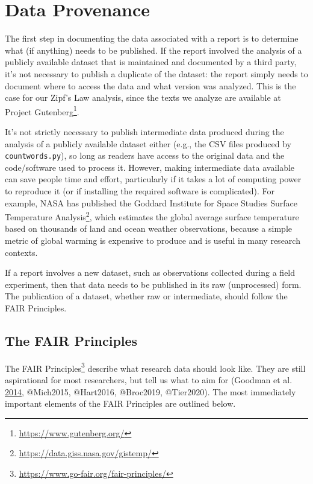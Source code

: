 \documentclass[
]{krantz}
\renewcommand{\href}[2]{#2\footnote{\url{#1}}}
\begin{document}
\hypertarget{provenance-data}{%
\section{Data Provenance}\label{provenance-data}}

The first step in documenting the data associated with a report
is to determine what (if anything) needs to be published.
If the report involved the analysis of a publicly available dataset
that is maintained and documented by a third party,
it's not necessary to publish a duplicate of the dataset:
the report simply needs to document where to access the data
and what version was analyzed.
This is the case for our Zipf's Law analysis,
since the texts we analyze are available at \href{https://www.gutenberg.org/}{Project Gutenberg}.

It's not strictly necessary to publish intermediate data
produced during the analysis of a publicly available dataset either
(e.g., the CSV files produced by \texttt{countwords.py}),
so long as readers have access to the original data and the code/software used to process it.
However,
making intermediate data available can save people time and effort,
particularly if it takes a lot of computing power to reproduce it
(or if installing the required software is complicated).
For example,
NASA has published
the \href{https://data.giss.nasa.gov/gistemp/}{Goddard Institute for Space Studies Surface Temperature Analysis},
which estimates the global average surface temperature
based on thousands of land and ocean weather observations,
because a simple metric of global warming is expensive to produce
and is useful in many research contexts.

If a report involves a new dataset,
such as observations collected during a field experiment,
then that data needs to be published in its raw (unprocessed) form.
The publication of a dataset,
whether raw or intermediate,
should follow the FAIR Principles.

\hypertarget{provenance-data-fair}{%
\subsection{The FAIR Principles}\label{provenance-data-fair}}

The \href{https://www.go-fair.org/fair-principles/}{FAIR Principles} describe what research data should look like.
They are still aspirational for most researchers,
but tell us what to aim for (Goodman et al. \protect\hyperlink{ref-Good2014}{2014}, @Mich2015, @Hart2016, @Broc2019, @Tier2020).
The most immediately important elements of the FAIR Principles are outlined below.
\end{document}
